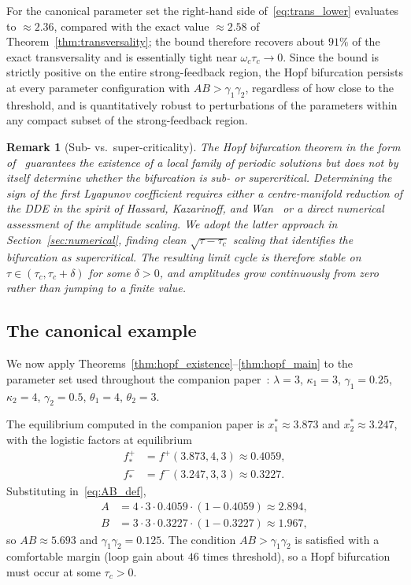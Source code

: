 \documentclass[sn-mathphys,Numbered]{sn-jnl}
\theoremstyle{thmstyleone}
\theoremstyle{thmstyletwo}
\theoremstyle{thmstylethree}
\newtheorem{remark}{Remark}
\begin{document}
For the canonical parameter set the right-hand side
of~\eqref{eq:trans_lower} evaluates to $\approx 2.36$, compared with
the exact value $\approx 2.58$ of Theorem~\ref{thm:transversality}; the
bound therefore recovers about $91\%$ of the exact transversality and
is essentially tight near $\omega_c\tau_c\to 0$. Since the bound is
strictly positive on the entire strong-feedback region, the Hopf
bifurcation persists at every parameter configuration with
$AB>\gamma_1\gamma_2$, regardless of how close to the threshold, and is
quantitatively robust to perturbations of the parameters within any
compact subset of the strong-feedback region.

\begin{remark}[Sub- vs.\ super-criticality]
\label{rem:supercritical}
The Hopf bifurcation theorem in the form
of~\cite[Thm.~11.1.1]{hale1993introduction} guarantees the existence of a
local family of periodic solutions but does not by itself determine
whether the bifurcation is sub- or supercritical. Determining the sign of
the first Lyapunov coefficient requires either a centre-manifold reduction
of the DDE in the spirit of Hassard, Kazarinoff, and
Wan~\cite{hassard1981theory} or a direct numerical assessment of the
amplitude scaling. We adopt the latter approach in
Section~\ref{sec:numerical}, finding clean $\sqrt{\tau-\tau_c}$ scaling
that identifies the bifurcation as supercritical. The resulting limit
cycle is therefore stable on $\tau\in(\tau_c,\tau_c+\delta)$ for some
$\delta>0$, and amplitudes grow continuously from zero rather than jumping
to a finite value.
\end{remark}

\subsection{The canonical example}
\label{sec:canonical}

We now apply Theorems~\ref{thm:hopf_existence}--\ref{thm:hopf_main} to
the parameter set used throughout the companion
paper~\cite{belgacem2026logistic}: $\lambda=3$, $\kappa_1=3$,
$\gamma_1=0.25$, $\kappa_2=4$, $\gamma_2=0.5$, $\theta_1=4$, $\theta_2=3$.

The equilibrium computed in the companion paper is
$x_1^*\approx 3.873$ and $x_2^*\approx 3.247$, with the logistic
factors at equilibrium
\begin{align*}
f^+_* &= f^+(3.873,4,3) \approx 0.4059,\\
f^-_* &= f^-(3.247,3,3) \approx 0.3227.
\end{align*}
Substituting in~\eqref{eq:AB_def},
\begin{align*}
A &= 4\cdot 3\cdot 0.4059\cdot(1-0.4059) \approx 2.894,\\
B &= 3\cdot 3\cdot 0.3227\cdot(1-0.3227) \approx 1.967,
\end{align*}
so $AB\approx 5.693$ and $\gamma_1\gamma_2=0.125$. The condition
$AB>\gamma_1\gamma_2$ is satisfied with a comfortable margin (loop gain
about $46$ times threshold), so a Hopf bifurcation must occur at some
$\tau_c>0$.
\end{document}
